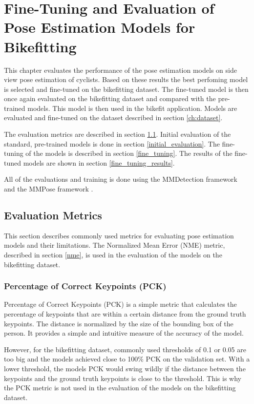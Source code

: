 
\chapter{Fine-Tuning and Evaluation of Pose Estimation Models for Bikefitting}
\label{training_pose_estimation_model_for_bikefitting}

This chapter evaluates the performance of the pose estimation models on side view pose estimation of cyclists. Based on these results the best perfoming model is selected and fine-tuned on the bikefitting dataset. The fine-tuned model is then once again evaluated on the bikefitting dataset and compared with the pre-trained models. This model is then used in the bikefit application. Models are evaluated and fine-tuned on the dataset described in section \ref{ch:dataset}.

The evaluation metrics are described in section \ref{evaluation_metrics}. Initial evaluation of the standard, pre-trained models is done in section \ref{initial_evaluation}. The fine-tuning of the models is described in section \ref{fine_tuning}. The results of the fine-tuned models are shown in section \ref{fine_tuning_results}.

All of the evaluations and training is done using the MMDetection framework \cite{mmdetection} and the MMPose framework \cite{mmpose2020}.

\section{Evaluation Metrics}
\label{evaluation_metrics}
This section describes commonly used metrics for evaluating pose estimation models and their limitations. The Normalized Mean Error (NME) metric, described in section \ref{nme}, is used in the evaluation of the models on the bikefitting dataset.



\subsection{Percentage of Correct Keypoints (PCK)}
Percentage of Correct Keypoints (PCK) is a simple metric that calculates the percentage of keypoints that are within a certain distance from the ground truth keypoints. The distance is normalized by the size of the bounding box of the person. It provides a simple and intuitive measure of the accuracy of the model.

However, for the bikefitting dataset, commonly used thresholds of 0.1 or 0.05 are too big and the models achieved close to 100\% PCK on the validation set. With a lower threshold, the models PCK would swing wildly if the distance between the keypoints and the ground truth keypoints is close to the threshold. This is why the PCK metric is not used in the evaluation of the models on the bikefitting dataset.


